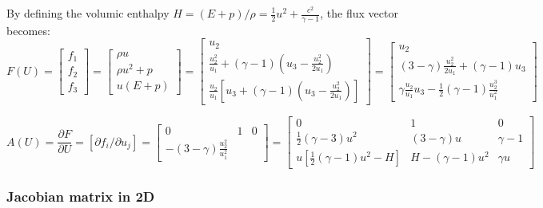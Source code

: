 \documentclass{article}
\begin{document}
By defining the volumic enthalpy $H=(E+p)/\rho = \frac{1}{2}u^2+\frac{c^2}{\gamma-1}$, the flux vector becomes:
\begin{equation}
  F(U) = \left[
    \begin{array}{c}
      f_1 \\
      f_2 \\
      f_3
    \end{array}
  \right] = \left[
    \begin{array}{c}
      \rho u\\
      \rho u^2 + p\\
      u(E+p)
    \end{array}
  \right] = \left[
    \begin{array}{c}
      u_2\\
      \frac{u_2^2}{u_1} + (\gamma-1) (u_3-\frac{u_2^2}{2u_1})\\
      \frac{u_2}{u_1} [ u_3 + (\gamma-1)(u_3-\frac{u_2^2}{2u_1}) ]
    \end{array}
  \right] = \left[
    \begin{array}{c}
      u_2\\
      (3-\gamma)\frac{u_2^2}{2u_1}+(\gamma-1)u_3\\
      \gamma \frac{u_2}{u_1} u_3 - \frac{1}{2}(\gamma-1)\frac{u_2^3}{u_1^2}
    \end{array}
  \right]
\end{equation}

\begin{equation}
  A(U) = \frac{\partial F}{\partial U} = \left[ \partial f_i/\partial u_j \right] = \left[
    \begin{array}{ccc}
      0 & 1 & 0 \\
      -(3-\gamma)\frac{u_2^2}{u_1^2} & 
    \end{array}
  \right] = \left[
    \begin{array}{ccc}
      0 & 1 & 0 \\
      \frac{1}{2}(\gamma-3) u^2 & (3-\gamma) u & \gamma-1\\
      u [\frac{1}{2}(\gamma-1)u^2-H] & H-(\gamma-1)u^2 & \gamma u
    \end{array}
  \right]
\end{equation}

\subsubsection*{Jacobian matrix in 2D}
\end{document}
